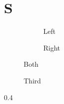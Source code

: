 \documentclass{article}
\begin{document}
\section{S}
\begin{figure}
\begin{subfigure}{0.4\textwidth}\caption{Left}\label{fa}\end{subfigure}
\begin{subfigure}{0.4\textwidth}\caption{Right}\label{fb}\end{subfigure}
\caption{Both}\label{f1}
\end{figure}
\begin{center}\label{f2}\end{center}
\begin{figure}\caption{Third}\label{f3}\end{figure}
\begin{table}
\begin{subtable}{0.4\textwidth}\caption{T}\label{ta}\end{subtable}
\caption{Tab}\label{t1}
\end{table}
\end{document}
